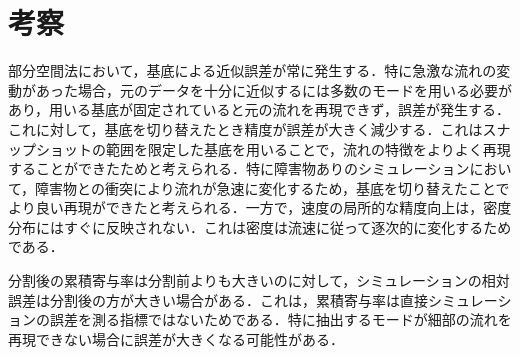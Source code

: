 \documentclass[a4j,12pt]{jreport}
\begin{document}
\section{考察}




部分空間法において，基底による近似誤差が常に発生する．特に急激な流れの変動があった場合，元のデータを十分に近似するには多数のモードを用いる必要があり，用いる基底が固定されていると元の流れを再現できず，誤差が発生する．これに対して，基底を切り替えたとき精度が誤差が大きく減少する．これはスナップショットの範囲を限定した基底を用いることで，流れの特徴をよりよく再現することができたためと考えられる．特に障害物ありのシミュレーションにおいて，障害物との衝突により流れが急速に変化するため，基底を切り替えたことでより良い再現ができたと考えられる．一方で，速度の局所的な精度向上は，密度分布にはすぐに反映されない．これは密度は流速に従って逐次的に変化するためである．

分割後の累積寄与率は分割前よりも大きいのに対して，シミュレーションの相対誤差は分割後の方が大きい場合がある．これは，累積寄与率は直接シミュレーションの誤差を測る指標ではないためである．特に抽出するモードが細部の流れを再現できない場合に誤差が大きくなる可能性がある．
\end{document}
